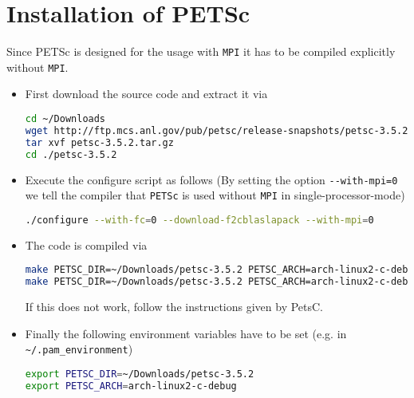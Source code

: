 \section{Installation of PETSc}
Since PETSc is designed for the usage with \texttt{MPI} it has to be compiled explicitly without \texttt{MPI}.
\begin{itemize}
\item First download the source code and extract it via
\begin{lstlisting}[language=bash, numbers=none]
cd ~/Downloads
wget http://ftp.mcs.anl.gov/pub/petsc/release-snapshots/petsc-3.5.2.tar.gz
tar xvf petsc-3.5.2.tar.gz
cd ./petsc-3.5.2
\end{lstlisting}
\item Execute the configure script as follows (By setting the option \verb|--with-mpi=0| we tell the compiler that \texttt{PETSc} is used without \texttt{MPI} in single-processor-mode)
\begin{lstlisting}[language=bash, numbers=none]
./configure --with-fc=0 --download-f2cblaslapack --with-mpi=0
\end{lstlisting}

\item The code is compiled via
\begin{lstlisting}[language=bash, numbers=none]
make PETSC_DIR=~/Downloads/petsc-3.5.2 PETSC_ARCH=arch-linux2-c-debug all
make PETSC_DIR=~/Downloads/petsc-3.5.2 PETSC_ARCH=arch-linux2-c-debug test
\end{lstlisting}
If this does not work, follow the instructions given by PetsC.

\item Finally the following environment variables have to be set (e.g. in \verb|~/.pam_environment|)
\begin{lstlisting}[language=bash, numbers=none]
export PETSC_DIR=~/Downloads/petsc-3.5.2
export PETSC_ARCH=arch-linux2-c-debug
\end{lstlisting}
\end{itemize}


